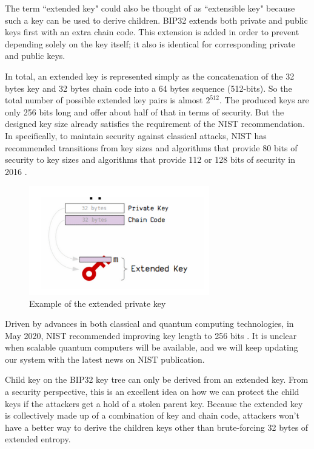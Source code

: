 The term ``extended key" could also be thought of as ``extensible key" because such a key can be used to derive children. BIP32 extends both private and public keys first with an extra chain code. This extension is added in order to prevent depending solely on the key itself; it also is identical for corresponding private and public keys.

In total, an extended key is represented simply as the concatenation of the 32 bytes key and 32 bytes chain code into a 64 bytes sequence (512-bits). So the total number of possible extended key pairs is almost $2^{512}$. The produced keys are only 256 bits long and offer about half of that in terms of security. But the designed key size already satisfies the requirement of the NIST recommendation. In specifically, to maintain security against classical attacks, NIST has recommended transitions from key sizes and algorithms that provide 80 bits of security to key sizes and algorithms that provide 112 or 128 bits of security in 2016 \cite{Barker2019}.

\begin{figure}[ht!]
    \centering
    \includegraphics[width=0.7\textwidth]{images/extended_key.png}
    \caption[Example of the extended private key]{Example of the extended private key \cite{learnme}}
    \label{fig:extended_key}
\end{figure}

Driven by advances in both classical and quantum computing technologies, in May 2020, NIST recommended improving key length to 256 bits \cite{Barker2020}. It is unclear when scalable quantum computers will be available, and we will keep updating our system with the latest news on NIST publication.

Child key on the BIP32 key tree can only be derived from an extended key. From a security perspective, this is an excellent idea on how we can protect the child keys if the attackers get a hold of a stolen parent key. Because the extended key is collectively made up of a combination of key and chain code, attackers won’t have a better way to derive the children keys other than brute-forcing 32 bytes of extended entropy.

